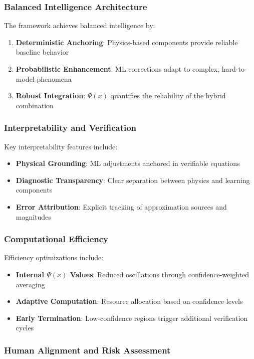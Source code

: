 \subsubsection{Balanced Intelligence Architecture}

The framework achieves balanced intelligence by:
\begin{enumerate}
    \item \textbf{Deterministic Anchoring}: Physics-based components provide reliable baseline behavior
    \item \textbf{Probabilistic Enhancement}: ML corrections adapt to complex, hard-to-model phenomena
    \item \textbf{Robust Integration}: $\Psi(x)$ quantifies the reliability of the hybrid combination
\end{enumerate}

\subsubsection{Interpretability and Verification}

Key interpretability features include:
\begin{itemize}
    \item \textbf{Physical Grounding}: ML adjustments anchored in verifiable equations
    \item \textbf{Diagnostic Transparency}: Clear separation between physics and learning components
    \item \textbf{Error Attribution}: Explicit tracking of approximation sources and magnitudes
\end{itemize}

\subsubsection{Computational Efficiency}

Efficiency optimizations include:
\begin{itemize}
    \item \textbf{Internal $\Psi(x)$ Values}: Reduced oscillations through confidence-weighted averaging
    \item \textbf{Adaptive Computation}: Resource allocation based on confidence levels
    \item \textbf{Early Termination}: Low-confidence regions trigger additional verification cycles
\end{itemize}

\subsubsection{Human Alignment and Risk Assessment}

